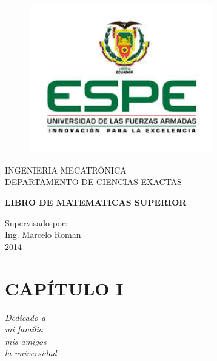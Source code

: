 \documentclass[11pt,a4paper,openright]{book}
\begin{document}

\begin{titlepage}
 \begin{center}
  \vspace*{-1in}
  \begin{figure}[htb]
   \begin{center}
    \includegraphics[width=8cm]{espe.jpg}
   \end{center}
 \end{figure}

  INGENIERIA MECATRÓNICA\\
  \vspace*{0.15in}
  DEPARTAMENTO DE CIENCIAS EXACTAS\\
  \vspace*{0.6in}
  \begin{Large}
   \textbf{LIBRO DE MATEMATICAS SUPERIOR} \\
   \author{Erik Quijije}
  \end{Large}
  \vspace*{0.3in}
  \begin{large}
   Supervisado por: \\
   Ing. Marcelo Roman \\
   2014\\
  \end{large}
 \end{center}
\end{titlepage}

\chapter*{CAPÍTULO I}
\begin{flushright}
\textit{Dedicado a \\
mi familia \\
mis amigos \\
la universidad}
\end{flushright}
\end{document}
